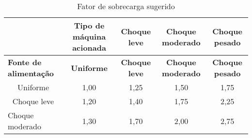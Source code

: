 \begin{table}[]
\centering
\caption{\label{tab:1} Fator de sobrecarga sugerido}
\begin{tabular}{l c c c c}
\hline
\textbf{}     & \textbf{ Tipo de máquina acionada}         & \textbf{Choque leve}      & \textbf{Choque moderado}  & \textbf{Choque pesado}    \\ \hline
\textbf{Fonte de alimentação}     & \textbf{Uniforme}         & \textbf{Choque leve}      & \textbf{Choque moderado}  & \textbf{Choque pesado}    \\ \hline
\multicolumn{1}{c}{Uniforme}    & \multicolumn{1}{c}{1,00} & \multicolumn{1}{c}{1,25} & \multicolumn{1}{c}{1,50} & \multicolumn{1}{c}{1,75} \\ \hline
\multicolumn{1}{c}{Choque leve} & \multicolumn{1}{c}{1,20} & \multicolumn{1}{c}{1,40} & \multicolumn{1}{c}{1,75} & \multicolumn{1}{c}{2,25} \\ \hline
Choque moderado                   & 1,30                      & 1,70                      & 2,00                      & 2,75                      \\ \hline
\end{tabular}
\end{table}